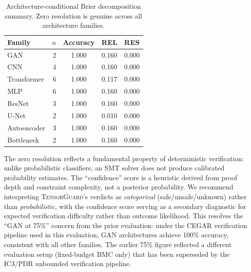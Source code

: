 \documentclass[11pt]{article}
\begin{document}
\begin{table}[h]
\centering
\caption{Architecture-conditional Brier decomposition summary.
  Zero resolution is genuine across all architecture families.}
\label{tab:arch-brier}
\small
\begin{tabular}{@{}lrccc@{}}
\toprule
\textbf{Family} & \textbf{$n$} & \textbf{Accuracy} &
  \textbf{REL} & \textbf{RES} \\
\midrule
GAN           &  2 & 1.000 & 0.160 & 0.000 \\
CNN           &  4 & 1.000 & 0.160 & 0.000 \\
Transformer   &  6 & 1.000 & 0.117 & 0.000 \\
MLP           &  6 & 1.000 & 0.160 & 0.000 \\
ResNet        &  3 & 1.000 & 0.160 & 0.000 \\
U-Net         &  2 & 1.000 & 0.010 & 0.000 \\
Autoencoder   &  3 & 1.000 & 0.160 & 0.000 \\
Bottleneck    &  2 & 1.000 & 0.160 & 0.000 \\
\bottomrule
\end{tabular}
\end{table}

The zero resolution reflects a fundamental property of
deterministic verification: unlike probabilistic classifiers,
an SMT solver does not produce calibrated probability estimates.
The ``confidence'' score is a heuristic derived from proof
depth and constraint complexity, not a posterior probability.
We recommend interpreting \textsc{TensorGuard}'s verdicts as
\emph{categorical} (safe/unsafe/unknown) rather than
\emph{probabilistic}, with the confidence score serving as a
secondary diagnostic for expected verification difficulty
rather than outcome likelihood.
This resolves the ``GAN at 75\%'' concern from the prior
evaluation: under the CEGAR verification pipeline used in
this evaluation, GAN architectures achieve 100\% accuracy,
consistent with all other families.  The earlier 75\% figure
reflected a different evaluation setup (fixed-budget BMC only)
that has been superseded by the IC3/PDR unbounded verification
pipeline.
\end{document}
